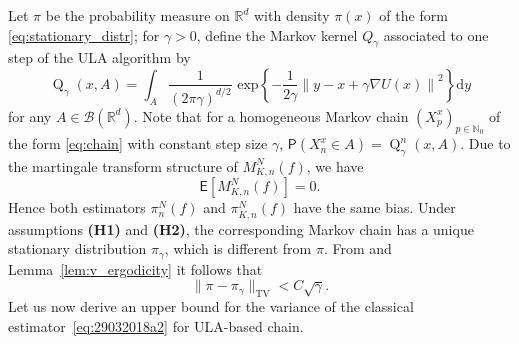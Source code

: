 \documentclass[bj]{imsart}
\def\nset{\mathbb{N}}
\def\rset{\mathbb{R}}
\def\rmd{\mathrm{d}}
\def\rset{\mathbb{R}}
\newcommand{\tvnorm}[1]{\| #1 \|_{\operatorname{TV}}}
\def\kerULA{\operatorname{Q}}
\begin{document}
Let $\pi$ be the probability measure on $\rset^d$ with density $\pi(x)$ of the form \eqref{eq:stationary_distr};
for $\gamma>0$, define the Markov kernel $Q_\gamma$ associated to one step of the ULA algorithm by
\begin{equation}
\label{eq:ula_kernel}
\kerULA_{\gamma}(x,A)=\int_{A} \frac{1}{(2 \pi \gamma)^{d/2}} \text{ exp} \left\{ -\frac{1}{2\gamma} \left\| y - x + \gamma \nabla U(x)\right\|^2\right\} \rmd y
\end{equation}
for any $A \in \mathcal{B}(\rset^d)$. Note that for a homogeneous Markov chain $\left(X^x_{p}\right)_{p \in \nset_0}$ of the form \eqref{eq:chain} with constant step size $\gamma$, $\mathsf{P}(X_n^x \in A) = \kerULA^n_{\gamma}(x,A)$. 
Due to the martingale transform structure
of $M_{K,n}^N(f)$,
we have
\[
\mathsf E\left[M_{K,n}^N(f)\right]=0.
\]
Hence both estimators
$\pi_n^N(f)$ and $\pi_{K,n}^N(f)$ have the same  bias. Under assumptions {\bf (H1)} and {\bf (H2)}, the corresponding Markov chain has a unique stationary distribution $\pi_\gamma$, which is different from $\pi$. From \cite[Theorem~10]{durmus:moulines:2017} and Lemma~\ref{lem:v_ergodicity} it follows that
\begin{equation}
\label{eq:bias_2}
\tvnorm{\pi - \pi_\gamma} < C\sqrt{\gamma}.
\end{equation}
Let us now derive an upper bound for the variance of the classical estimator~\eqref{eq:29032018a2} for ULA-based chain. 
\end{document}

